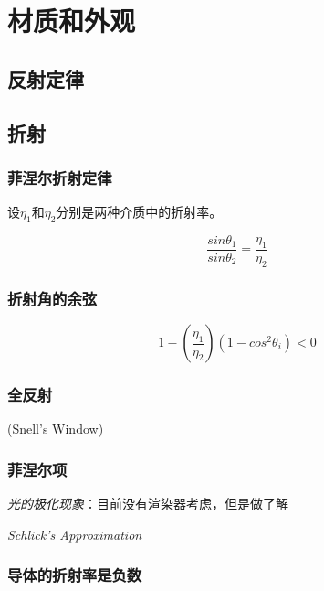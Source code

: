 \chapter{材质和外观}

\section{反射定律}

\section{折射}

\subsection*{菲涅尔折射定律}

设$\eta_1$和$\eta_2$分别是两种介质中的折射率。

\begin{equation}
    \frac{sin\theta_1}{sin\theta_2}=\frac{\eta_1}{\eta_2}
\end{equation}

\subsection*{折射角的余弦}

\begin{equation}
    1-(\frac{\eta_1}{\eta_2})(1-cos^2\theta_i)<0
\end{equation}

\subsection*{全反射}

\begin{example}
    (Snell's Window)
\end{example}

\subsection*{菲涅尔项}

\textsl{光的极化现象}：目前没有渲染器考虑，但是做了解

\textsl{Schlick's Approximation}

\subsection*{导体的折射率是负数}

